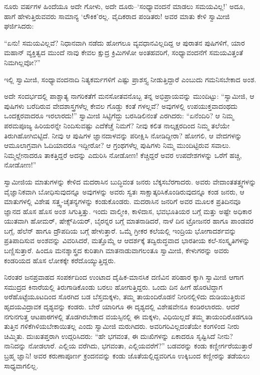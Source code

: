 ನೂರು ವರ್ಷಗಳ ಹಿಂದೆಯೂ ಅದೇ ಗೋಳು, ಅದೇ ದೂರು–‘ಸಂಧ್ಯಾವಂದನೆ ಮಾಡಲು ಸಮಯವಿಲ್ಲ!’ ಅದೂ, ಹಾಗೆ ಹೇಳುತ್ತಿರುವವರು ಸಾಮಾನ್ಯ ‘ಲೌಕಿಕ’ರಲ್ಲ. ವೈದಿಕರಾದ ಪಂಡಿತರು! ಅವರ ಮಾತು ಕೇಳಿ ಸ್ವಾಮೀಜಿ ಘರ್ಜಿಸಿದರು:

“ಏನು! ಸಮಯವಿಲ್ಲವೆ? ನಿಧಾನವಾಗಿ ನಡೆದು ಹೋಗಲೂ ವ್ಯವಧಾನವಿಲ್ಲದಿದ್ದ ಆ ಪುರಾತನ ಪುಷಿಗಳಿಗೆ, ಯಾರ ಮಹಾನ್ ವ್ಯಕ್ತಿತ್ವದ ಮುಂದೆ ನಾವು ಕೇವಲ ಕ್ಷುದ್ರ ಕ್ರಿಮಿಗಳೋ ಅಂತಹವರಿಗೆ, ಸಂಧ್ಯಾವಂದನೆಗೆ ಸಮಯವಿತ್ತಂತೆ ನಿಮಗಿಲ್ಲವೋ?”

ಇಲ್ಲಿ ಸ್ವಾಮೀಜಿ, ಸಂಧ್ಯಾವಂದನಾದಿ ನಿತ್ಯಕರ್ಮಗಳಿಗೆ ಎಷ್ಟು ಪ್ರಾಶಸ್ತ್ಯ ನೀಡುತ್ತಿದ್ದಾರೆ ಎಂಬುದು ಗಮನಿಸಬೇಕಾದ ಅಂಶ.

ಅದೇ ಸಂದರ್ಭದಲ್ಲಿ ಪಾಶ್ಚಾತ್ಯ ನಾಗರಿಕತೆಗೆ ಮನಸೋತವನೊಬ್ಬ ತನ್ನ ಅಭಿಪ್ರಾಯವನ್ನು ಮುಂದಿಟ್ಟು: “ಸ್ವಾಮೀಜಿ, ಆ ಪುಷಿಗಳು ಬರೆದಿರುವ ವೇದಶಾಸ್ತ್ರಗಳೆಲ್ಲ ಕೇವಲ ಗೊಡ್ಡು ಕಂತೆ ಗಳಲ್ಲವೆ? ಅವುಗಳಲ್ಲಿ ಉಪಯುಕ್ತವಾದಂಥದು ಒಂದಕ್ಷರವಾದರೂ ಇರಲಾರದು!” ಸ್ವಾಮೀಜಿ ಸಿಟ್ಟಿಗೆದ್ದು ಬರಸಿಡಿಲಿನಂತೆ ಎರಗಿದರು: “ಏನೆಂದಿರಿ? ಆ ನಿಮ್ಮ ಪರಮಪೂಜ್ಯ ಹಿರಿಯರನ್ನೇ ನಿಂದಿಸುವಷ್ಟು ಎದೆಕೆಚ್ಚೆ ನಿಮಗೆ? ನೀವು ಕಲಿತ ನಾಲ್ಕಕ್ಷರದಿಂದ ನಿಮ್ಮ ತಲೆಯೇ ತಿರುಗಿಹೋಗಿಬಿಟ್ಟಿದೆ. ನೀವು ಆ ಪುಷಿಗಳ ಜ್ಞಾನದಾಳವನ್ನು ಪರೀಕ್ಷಿಸಿ ನೋಡಿದ್ದೀರಾ? ಹೋಗಲಿ, ಆ ವೇದಗಳನ್ನು ಆಮೂಲಾಗ್ರವಾಗಿ ಓದಿಯಾದರೂ ಇದ್ದೀರೋ? ಆ ಗ್ರಂಥಗಳೆಲ್ಲ ಪುಷಿಗಳು ನಿಮ್ಮ ಮುಂದಿಟ್ಟಿರುವ ಸವಾಲು. ನಿಮ್ಮಲ್ಲೇನಾದರೂ ತಾಕತ್ತಿದ್ದರೆ ಅದನ್ನು ಎದುರಿಸಿ ನೋಡೋಣ! ಕೆಚ್ಚಿದ್ದರೆ ಅವರ ಉಪದೇಶಗಳನ್ನು ಒರೆಗೆ ಹಚ್ಚಿ, ನೋಡೋಣ!”

ಸ್ವಾಮೀಜಿಯ ಮಾತುಗಳನ್ನು ಕೇಳಿದ ಮದರಾಸಿನ ಬುದ್ಧಿವಂತ ಜನರು ಬೆಕ್ಕಸಬೆರಗಾದರು. ಅವರು ವೇದಾಂತತತ್ತ್ವಗಳನ್ನು ವೈಜ್ಞಾನಿಕವಾಗಿ ಬೋಧಿಸುವುದನ್ನೂ ಅವುಗಳನ್ನು ಅವರು ಸ್ವತಃ ಸಾಕ್ಷಾತ್ಕರಿಸಿಕೊಂಡಿರುವುದನ್ನೂ ಕಂಡ ಜನರು, ಆ ಮಾತುಗಳಲ್ಲಿ ವಿಶೇಷ ಸತ್ತ್ವ-ಚೈತನ್ಯಗಳನ್ನು ಕಂಡುಕೊಂಡರು. ಮದರಾಸಿನ ಜನರಿಗೆ ಅವರ ಮೂಲಕ ಪ್ರತಿದಿನವೂ ಜ್ಞಾನದ ಹೊಸ ಹೊಸ ಅಂಶ ಸಿಗುತ್ತಿತ್ತು. ಇಂದು ವಾಲ್ಮೀಕಿ, ಕಾಳಿದಾಸ, ಭವಭೂತಿಯರ ಬಗ್ಗೆ ಮತ್ತು ಅಷ್ಟೇ ಅಧಿಕಾರ ಯುತವಾಗಿ ಹೋಮರ್, ಷೇಕ್ಸ್​ಪಿಯರ್, ಬೈರನ್ನರ ಬಗ್ಗೆ ಮಾತನಾಡಿದರೆ, ನಾಳೆ ದಿನ ಟ್ರೋಜನರ ಹಾಗೂ ಪಾಂಡವರ ಬಗ್ಗೆ, ಹೆಲೆನ್ ಹಾಗೂ ದ್ರೌಪದಿಯ ಬಗ್ಗೆ ಹೇಳುತ್ತಾರೆ. ಒಮ್ಮೆ ಗ್ರೀಕರ ಕಲೆಯಲ್ಲಿ ಇಂದ್ರಿಯ ಭೋಗಾದರ್ಶವನ್ನು ಪ್ರತಿಪಾದಿಸುವ ಅಂಶವನ್ನು ವಿವರಿಸಿದರೆ, ಮತ್ತೊಮ್ಮೆ ಆ ಆದರ್ಶಕ್ಕೆ ತದ್ವಿರುದ್ಧವಾದ ಭಾರತೀಯ ಕಲೆ-ಸಂಸ್ಕೃತಿಗಳನ್ನು ಬಣ್ಣಿಸುತ್ತಾರೆ. ಹಿಂದೂ ಮನಶ್ಶಾಸ್ತ್ರದ ಕುರಿತಾಗಿ ಮಾತನಾಡುವಾಗಲಂತೂ ಸ್ವಾಮೀಜಿ, ಕೇಳುಗರನ್ನು ಅವರು ಕಂಡರಿಯದ ಹೊಸ ಲೋಕಕ್ಕೇ ಕರೆದೊಯ್ಯುತ್ತಿದ್ದರು.

ನಿರಂತರ ಜನಪ್ರವಾಹದ ಸಂಪರ್ಕದಿಂದ ಉಂಟಾದ ದೈಹಿಕ-ಮಾನಸಿಕ ದಣಿವಿನ ಪರಿಹಾರ ಕ್ಕಾಗಿ ಸ್ವಾಮೀಜಿ ಆಗಾಗ ಸಮುದ್ರದ ಕಿನಾರೆಯಲ್ಲಿ ತಿರುಗಾಡಿಕೊಂಡು ಬರಲು ಹೋಗುತ್ತಿದ್ದರು. ಒಂದು ದಿನ ಹೀಗೆ ಹೊರಟಿದ್ದಾಗ ಅರೆಹೊಟ್ಟೆಯೂಟದಿಂದ ಸೊರಗಿದ ಬಡ ಬೆಸ್ತಮಕ್ಕಳು, ತಮ್ಮ ತಾಯಂದಿರೊಡನೆ ನೀರಿನಲ್ಲಿಳಿದು ದುಡಿಯುತ್ತಿರುವ ಹೃದಯವಿದ್ರಾವಕ ದೃಶ್ಯವನ್ನು ಕಂಡರು. ಬೇರೆ ಯಾರಿಗೂ ಈ ದೃಶ್ಯದಲ್ಲಿ ವಿಶೇಷವೇನೂ ಕಂಡಿರಲಾರದು. ಆದರೆ ನಗುನಗುತ್ತ ಆಟಪಾಠಗಳಲ್ಲಿ ತೊಡಗಿರಬೇಕಾದ ವಯಸ್ಸಿನಲ್ಲಿ ಈ ಮಕ್ಕಳು, ವಿಧಿಯಿಲ್ಲದೆ ತಮ್ಮ ತಾಯಂದಿರೊಡಗೂಡಿ ತುತ್ತಿನ ಗಳಿಕೆಗಿಳಿಯಬೇಕಾಯಿತಲ್ಲ ಎಂದು ಸ್ವಾಮೀಜಿ ಮರುಗಿದರು. ಅವರಿಗರಿವಿಲ್ಲದಂತೆಯೇ ಕಂಗಳಿಂದ ನೀರು ಚಿಮ್ಮಿತು. ದುಃಖತಪ್ತರಾಗಿ ಉದ್ಗರಿಸಿದರು: “ಹೇ ಭಗವಂತ, ಈ ದುಃಖಿಗಳನ್ನು ಏಕಾದರೂ ಸೃಷ್ಟಿಸಿದೆ ನೀನು? ನಾನಿದನ್ನು ನೋಡಲಾರೆ. ಎಲ್ಲಿಯ ವರೆಗಿದು, ಭಗವಂತಾ, ಎಲ್ಲಿಯವರೆಗೆ?” ಬಡವರನ್ನು ಕಂಡು ಕಣ್ಣೀರ್ಗರೆಯುತ್ತಾರೆ ಬ್ರಹ್ಮ ಜ್ಞಾನಿ! ಅವರ ಕರುಣಾಪೂರ್ಣ ಕ್ರಂದನವನ್ನು ಕಂಡು ಜೊತೆಯಲ್ಲಿದ್ದವರಿಗೂ ಉಕ್ಕಿಬಂದ ಕಣ್ಣೀರನ್ನು ತಡೆಯಲು ಸಾಧ್ಯವಾಗಲಿಲ್ಲ.

